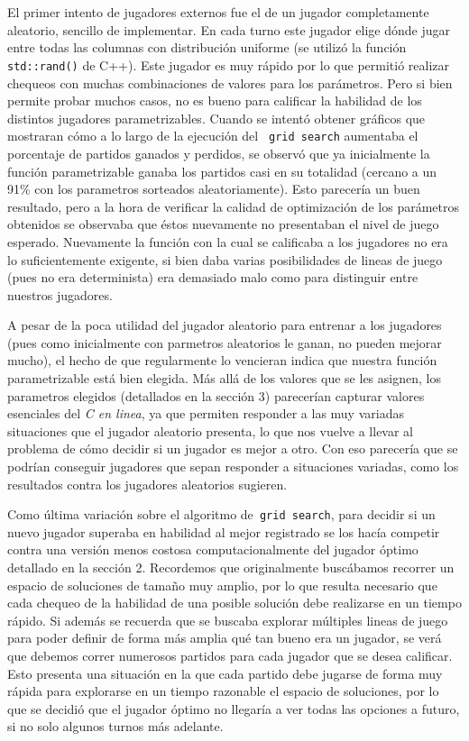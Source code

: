\documentclass[A4paper,oneside,fleqn,11pt]{article}
\theoremstyle{definition}
\begin{document}
El primer intento de jugadores externos fue el de un jugador completamente aleatorio, sencillo de implementar. En cada turno este jugador elige dónde jugar entre todas las columnas con distribución uniforme (se utilizó la función\texttt{ std::rand()} de C++). Este jugador es muy rápido por lo que permitió realizar chequeos con muchas combinaciones de valores para los parámetros. Pero si bien permite probar muchos casos, no es bueno para calificar la habilidad de los distintos jugadores parametrizables. Cuando se intentó obtener gráficos que mostraran cómo a lo largo de la ejecución del \texttt{ grid search} aumentaba el porcentaje de partidos ganados y perdidos, se observó que ya inicialmente la función parametrizable ganaba los partidos casi en su totalidad (cercano a un 91\% con los parametros sorteados aleatoriamente). Esto parecería un buen resultado, pero a la hora de verificar la calidad de optimización de los parámetros obtenidos se observaba que éstos nuevamente no presentaban el nivel de juego esperado. Nuevamente la función con la cual se calificaba a los jugadores no era lo suficientemente exigente, si bien daba varias posibilidades de lineas de juego (pues no era determinista) era demasiado malo como para distinguir entre nuestros jugadores. 

A pesar de la poca utilidad del jugador aleatorio para entrenar a los jugadores (pues como inicialmente con parmetros aleatorios le ganan, no pueden mejorar mucho), el hecho de que regularmente lo vencieran indica que nuestra función parametrizable está bien elegida. Más allá de los valores que se les asignen, los parametros elegidos (detallados en la sección 3) parecerían capturar valores esenciales del \textit{C en linea}, ya que permiten responder a las muy variadas situaciones que el jugador aleatorio presenta, lo que nos vuelve a llevar al problema de cómo decidir si un jugador es mejor a otro. Con eso parecería que se podrían conseguir jugadores que sepan responder a situaciones variadas, como los resultados contra los jugadores aleatorios sugieren.

Como última variación sobre el algoritmo de\texttt{ grid search}, para decidir si un nuevo jugador superaba en habilidad al mejor registrado se los hacía competir contra una versión menos costosa computacionalmente del jugador óptimo detallado en la sección 2. Recordemos que originalmente buscábamos recorrer un espacio de soluciones de tamaño muy amplio, por lo que resulta necesario que cada chequeo de la habilidad de una posible solución debe realizarse en un tiempo rápido. Si además se recuerda que se buscaba explorar múltiples lineas de juego para poder definir de forma más amplia qué tan bueno era un jugador, se verá que debemos correr numerosos partidos para cada jugador que se desea calificar. Esto presenta una situación en la que cada partido debe jugarse de forma muy rápida para explorarse en un tiempo razonable el espacio de soluciones, por lo que se decidió que el jugador óptimo no llegaría a ver todas las opciones a futuro, si no solo algunos turnos más adelante.
\end{document}

